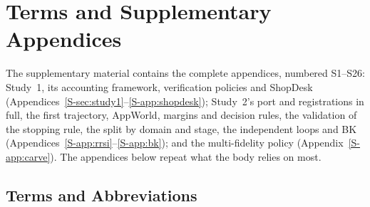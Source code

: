 \documentclass[11pt]{article}
\begin{document}


\appendix

\section{Terms and Supplementary Appendices}
\label{app:guide}
The supplementary material contains the complete appendices, numbered S1--S26: Study~1, its accounting framework, verification policies and ShopDesk (Appendices~\ref*{S-sec:study1}--\ref*{S-app:shopdesk}); Study~2's port and registrations in full, the first trajectory, AppWorld, margins and decision rules, the validation of the stopping rule, the split by domain and stage, the independent loops and BK (Appendices~\ref*{S-app:rrsi}--\ref*{S-app:bk}); and the multi-fidelity policy (Appendix~\ref*{S-app:carve}). The appendices below repeat what the body relies on most.

\subsection*{Terms and Abbreviations}
\label{app:terms}
\end{document}
